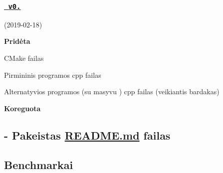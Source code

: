 \subsubsection*{\href{https://github.com/gitguuddd/Obj_Duomenu_apdorojimas/releases/tag/v0.1}{\texttt{ v0.}}}

(2019-\/02-\/18)

{\bfseries{Pridėta}}
\begin{DoxyItemize}
\item C\+Make failas
\item Pirmininis programos {\ttfamily cpp} failas
\item Alternatyvios programos (su masyvu ) {\ttfamily cpp} failas (veikiantis bardakas)
\end{DoxyItemize}

{\bfseries{Koreguota}} \subsection*{-\/ Pakeistas \mbox{\hyperlink{_r_e_a_d_m_e_8md}{R\+E\+A\+D\+M\+E.\+md}} failas }

\subsection*{Benchmark\textquotesingle{}ai}

